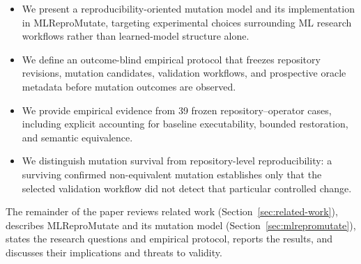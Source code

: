 \begin{itemize}
    \item We present a reproducibility-oriented mutation model and its
    implementation in MLReproMutate, targeting experimental choices surrounding
    ML research workflows rather than learned-model structure alone.

    \item We define an outcome-blind empirical protocol that freezes repository
    revisions, mutation candidates, validation workflows, and prospective oracle
    metadata before mutation outcomes are observed.

    \item We provide empirical evidence from 39 frozen
    repository--operator cases, including explicit accounting for baseline
    executability, bounded restoration, and semantic equivalence.

    \item We distinguish mutation survival from repository-level
    reproducibility: a surviving confirmed non-equivalent mutation establishes
    only that the selected validation workflow did not detect that particular
    controlled change.
\end{itemize}

The remainder of the paper reviews related work
(Section~\ref{sec:related-work}), describes MLReproMutate and its mutation model
(Section~\ref{sec:mlrepromutate}), states the research questions and empirical
protocol, reports the results, and discusses their implications and threats to
validity.
